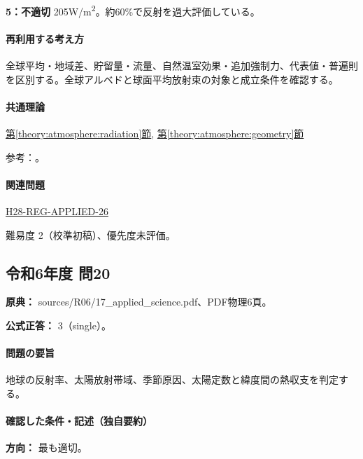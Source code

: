 \noindent\textbf{5：不適切} 205W/m\textsuperscript{2}。約60\%で反射を過大評価している。\par

\paragraph{再利用する考え方} 全球平均・地域差、貯留量・流量、自然温室効果・追加強制力、代表値・普遍則を区別する。全球アルベドと球面平均放射束の対象と成立条件を確認する。

\paragraph{共通理論} \hyperref[theory:atmosphere:radiation]{第\ref*{theory:atmosphere:radiation}節}, \hyperref[theory:atmosphere:geometry]{第\ref*{theory:atmosphere:geometry}節}

\par 参考：\cite{atm_nasa_budget,atm_nasa_albedo}。

\paragraph{関連問題} \hyperref[q:h28-reg-applied-26]{H28-REG-APPLIED-26}

\par 難易度 2（校準初稿）、優先度未評価。

\subsection{令和6年度 問20}
\label{q:r06-reg-applied-20}

\noindent\textbf{原典：} sources/R06/17\_applied\_science.pdf、PDF物理6頁。

\textbf{公式正答：} 3（single）。

\paragraph{問題の要旨} 地球の反射率、太陽放射帯域、季節原因、太陽定数と緯度間の熱収支を判定する。

\paragraph{確認した条件・記述（独自要約）}\mbox{}\par

\noindent\textbf{方向：} 最も適切。\par

